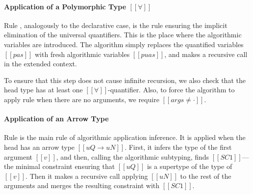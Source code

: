 \paragraph{Application of a Polymorphic Type $[[∀]]$}
  Rule ,
  analogously to the declarative case,
  is the rule ensuring the implicit elimination of the universal quantifiers. 
  This is the place where the algorithmic variables are introduced.
  The algorithm simply replaces the quantified variables 
  $[[pas]]$ with fresh algorithmic variables $[[puas]]$,
  and makes a recursive call in the extended context.

  To ensure that this step does not cause infinite recursion, 
  we also check that the head type has at least one 
  $[[∀]]$-quantifier. Also, to force the algorithm to
  apply rule  when  
  there are no arguments, we require $[[args ≠ ·]]$.

\paragraph{Application of an Arrow Type}
  Rule 
  is the main rule of algorithmic application inference.
  It is applied when the head has an arrow type $[[uQ → uN]]$.
  First, it infers the type of the first argument $[[v]]$,
  and then, calling the algorithmic subtyping,
  finds $[[SC1]]$---the minimal constraint ensuring that 
  $[[uQ]]$ is a supertype of the type of $[[v]]$.
  Then it makes a recursive call applying $[[uN]]$ to the rest of the arguments 
  and merges the resulting constraint with $[[SC1]]$.